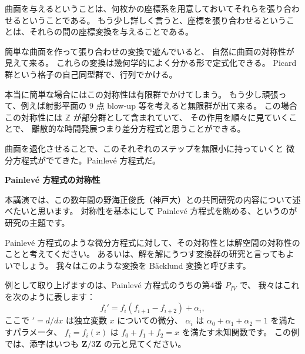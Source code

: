 \documentclass[uplatex,dvipdfmx]{jlreq}
\begin{document}
\bigskip
\hspace*{\fill}{\large\bfseries 坂井　秀隆（東大・数理）}

\bigskip

曲面を与えるということは、何枚かの座標系を用意しておいてそれらを張り合わせるということである。
もう少し詳しく言うと、座標を張り合わせるということは、それらの間の座標変換を与えることである。

簡単な曲面を作って張り合わせの変換で遊んでいると、
自然に曲面の対称性が見えて来る。
これらの変換は幾何学的によく分かる形で定式化できる。
Picard 群という格子の自己同型群で、行列でかける。

本当に簡単な場合にはこの対称性は有限群でかけてしまう。
もう少し頑張って、例えば射影平面の $9$ 点 blow-up 等を考えると無限群が出て来る。
この場合この対称性には $\mathbb{Z}$ が部分群として含まれていて、
その作用を順々に見ていくことで、
離散的な時間発展つまり差分方程式と思うことができる。

曲面を退化させることで、このそれぞれのステップを無限小に持っていくと
微分方程式がでてきた。Painlevé 方程式だ。

\newpage

\begin{center}
  {\large\bfseries Painlevé 方程式の対称性}
\end{center}

\bigskip
\hspace*{\fill}{\large\bfseries 山田　泰彦（神戸大・自然科学）}

\bigskip

本講演では、この数年間の野海正俊氏（神戸大）との共同研究の内容について述べたいと思います。
対称性を基本にして Painlevé 方程式を眺める、というのが研究の主題です。

Painlevé 方程式のような微分方程式に対して、その対称性とは解空間の対称性のことと考えてください。
あるいは、解を解にうつす変換群の研究と言ってもよいでしょう。
我々はこのような変換を Bäcklund 変換と呼びます。

例として取り上げますのは、Painlevé 方程式のうちの第4番 $P_{IV}$ で、
我々はこれを次のように表します：
\begin{equation}
  f_i' = f_i(f_{i+1} - f_{i+2}) + \alpha_i,
\end{equation}
ここで ${}' = d/dx$ は独立変数 $x$ についての微分、
$\alpha_i$ は $\alpha_0 + \alpha_1 + \alpha_2 = 1$ を満たすパラメータ、
$f_i = f_i(x)$ は $f_0 + f_1 + f_2 = x$ を満たす未知関数です。
この例では、添字はいつも $\mathbf{Z}/3\mathbf{Z}$ の元と見てください。
\end{document}

